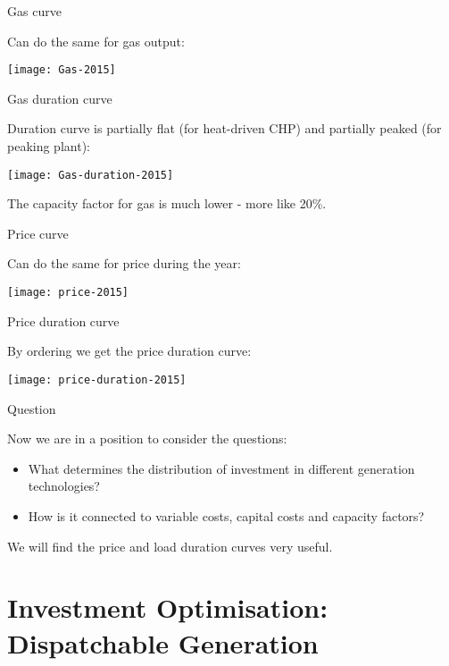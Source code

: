 \documentclass[10pt,aspectratio=169,dvipsnames]{beamer}
\let\olditem\item
\renewcommand{\item}{%
\olditem\vspace{5pt}}
\begin{document}
\begin{frame}{Gas curve}

  Can do the same for gas output:

  \centering
  \texttt{[image: Gas-2015]}

\end{frame}

\begin{frame}{Gas duration curve}

  Duration curve is partially flat (for heat-driven CHP) and partially peaked (for \alert{peaking plant}):

  \centering
  \texttt{[image: Gas-duration-2015]}

  \raggedright
  The capacity factor for gas is much lower - more like 20\%.
\end{frame}

\begin{frame}{Price curve}

  Can do the same for price during the year:

  \centering
  \texttt{[image: price-2015]}

\end{frame}

\begin{frame}{Price duration curve}

  By ordering we get the \alert{price duration curve}:

  \centering
  \texttt{[image: price-duration-2015]}

\end{frame}



\begin{frame}{Question}



  Now we are in a position to consider the questions:

  \begin{itemize}
    \item What determines the distribution of investment in different generation technologies?
    \item How is it connected to variable costs, capital costs and capacity factors?
  \end{itemize}

  We will find the price and load duration curves very useful.
\end{frame}


\section{Investment Optimisation: Dispatchable Generation}
\end{document}
